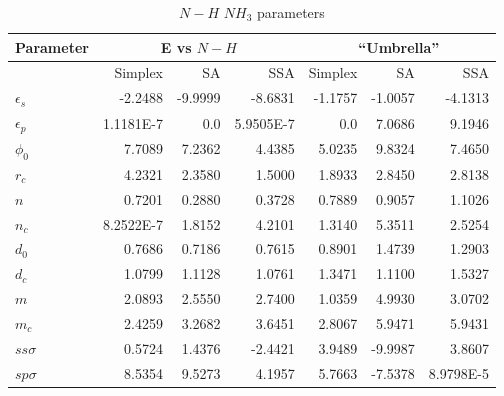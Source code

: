 \begin{table}[!htb]
\caption{$N-H$ $NH_3$ parameters}
\label{tablenh3}
\begin{center}
\begin{tabular}{|l|r|r|r|r|r|r|}
\hline
Parameter &\multicolumn{3}{|c|}{E vs $N-H$}&\multicolumn{3}{|c|}{``Umbrella''}\\
\hline
 & Simplex & SA & SSA& Simplex & SA & SSA\\
\hline
\hline
$\epsilon_s$&-2.2488&-9.9999&-8.6831&-1.1757&-1.0057&-4.1313\\
\hline
$\epsilon_p$& 1.1181E-7&0.0&5.9505E-7&0.0&7.0686&9.1946\\
\hline
$\phi_0$&7.7089&7.2362&4.4385&5.0235&9.8324&7.4650\\
\hline
$r_c$&4.2321&2.3580&1.5000&1.8933&2.8450&2.8138\\
\hline
$n$&0.7201&0.2880&0.3728&0.7889&0.9057&1.1026\\
\hline
$n_c$&8.2522E-7&1.8152&4.2101&1.3140&5.3511& 2.5254\\
\hline
$d_0$&0.7686&0.7186&0.7615&0.8901&1.4739&1.2903\\
\hline
$d_c$&1.0799&1.1128&1.0761&1.3471&1.1100&1.5327\\
\hline
$m$&2.0893&2.5550&2.7400&1.0359&4.9930&3.0702\\
\hline
$m_c$&2.4259&3.2682&3.6451&2.8067&5.9471&5.9431\\
\hline
$ss\sigma$&0.5724&1.4376&-2.4421&3.9489&-9.9987&3.8607\\
\hline
$sp\sigma$&8.5354&9.5273& 4.1957&5.7663&-7.5378&8.9798E-5\\
\hline
\end{tabular}
\end{center}
\end{table}
